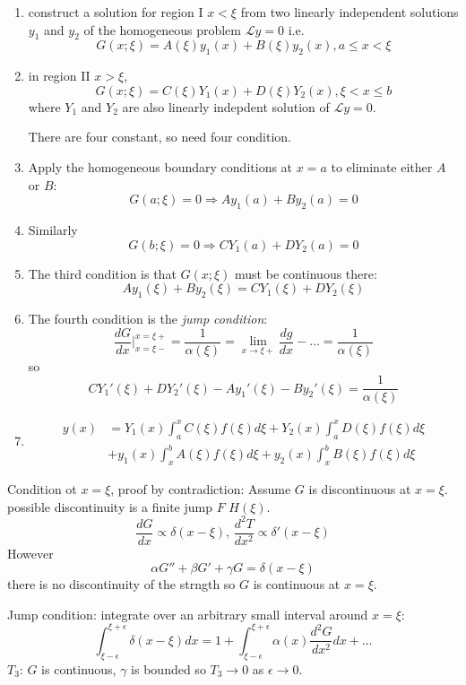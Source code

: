 \documentclass[a4paper]{article}
\renewcommand*\L{\mathcal{L}}
\begin{document}
\begin{enumerate}
\item construct a solution for region I \(x < \xi\) from two linearly independent solutions \(y_1\) and \(y_2\) of the homogeneous problem \(\L y = 0\) i.e.
  \[
    G(x; \xi) = A(\xi)y_1(x) + B(\xi)y_2(x), a \leq x < \xi
  \]
\item in region II \(x > \xi\),
  \[
    G(x; \xi) = C(\xi)Y_1(x) + D(\xi)Y_2(x), \xi < x \leq b
  \]
  where \(Y_1\) and \(Y_2\) are also linearly indepdent solution of \(\L y = 0\).

  There are four constant, so need four condition.
\item Apply the homogeneous boundary conditions at \(x = a\) to eliminate either \(A\) or \(B\):
  \[
    G(a; \xi) = 0 \Rightarrow Ay_1(a) + By_2(a) = 0
  \]
\item Similarly
  \[
    G(b; \xi) = 0 \Rightarrow CY_1(a) + DY_2(a) = 0
  \]
\item The third condition is that \(G(x; \xi)\) must be continuous there:
  \[
    Ay_1(\xi) + By_2(\xi) = CY_1(\xi) + DY_2(\xi)
  \]
\item The fourth condition is the \emph{jump condition}:
  \[
    \frac{dG}{dx} \Big|_{x = \xi-}^{x = \xi+} = \frac{1}{\alpha(\xi)} = \lim_{x \to \xi+} \frac{dg}{dx} - \dots = \frac{1}{\alpha(\xi)}
  \]
  so
  \[
    CY_1'(\xi) + DY_2'(\xi) - Ay_1'(\xi) - By_2'(\xi) = \frac{1}{\alpha(\xi)}
  \]
\item
  \begin{align*}
    y(x) &= Y_1(x) \int_{a}^{x} C(\xi)f(\xi) d\xi + Y_2(x) \int_{a}^{x} D(\xi)f(\xi) d\xi \\
    &+ y_1(x) \int_{x}^{b} A(\xi)f(\xi) d\xi + y_2(x) \int_{x}^{b} B(\xi)f(\xi) d\xi
  \end{align*}
\end{enumerate}

Condition ot \(x = \xi\), proof by contradiction:
Assume \(G\) is discontinuous at \(x = \xi\). possible discontinuity is a finite jump \(F\) \(H(\xi)\).
\[
  \frac{dG}{dx} \propto \delta(x - \xi), \, \frac{d^2T}{dx^2} \propto \delta'(x - \xi)
\]
However
\[
  \alpha G'' + \beta G' + \gamma G = \delta(x - \xi)
\]
there is no discontinuity of the strngth so \(G\) is continuous at \(x = \xi\).

Jump condition: integrate over an arbitrary small interval around \(x = \xi\):
\[
  \int_{\xi - \epsilon}^{\xi + \epsilon} \delta(x - \xi) dx = 1 + \int_{\xi -\epsilon}^{\xi + \epsilon} \alpha(x) \frac{d^2G}{dx^2} dx + \dots
\]
\(T_3\): \(G\) is continuous, \(\gamma\) is bounded so \(T_3 \to 0\) as \(\epsilon \to 0\).
\end{document}
